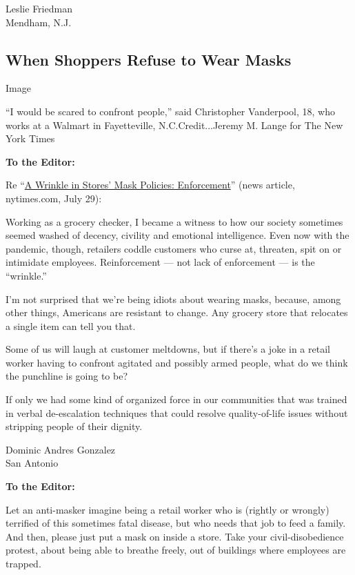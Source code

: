 Leslie Friedman\\
Mendham, N.J.

\hypertarget{when-shoppers-refuse-to-wear-masks}{%
\subsection{When Shoppers Refuse to Wear
Masks}\label{when-shoppers-refuse-to-wear-masks}}

Image

``I would be scared to confront people,'' said Christopher Vanderpool,
18, who works at a Walmart in Fayetteville, N.C.Credit...Jeremy M. Lange
for The New York Times

\textbf{To the Editor:}

Re
``\href{https://www.nytimes.com/2020/07/29/business/coronavirus-masks-stores-walmart.html?action=click\&module=Top\%20Stories\&pgtype=Homepage}{A
Wrinkle in Stores' Mask Policies: Enforcement}'' (news article,
nytimes.com, July 29):

Working as a grocery checker, I became a witness to how our society
sometimes seemed washed of decency, civility and emotional intelligence.
Even now with the pandemic, though, retailers coddle customers who curse
at, threaten, spit on or intimidate employees. Reinforcement --- not
lack of enforcement --- is the ``wrinkle.''

I'm not surprised that we're being idiots about wearing masks, because,
among other things, Americans are resistant to change. Any grocery store
that relocates a single item can tell you that.

Some of us will laugh at customer meltdowns, but if there's a joke in a
retail worker having to confront agitated and possibly armed people,
what do we think the punchline is going to be?

If only we had some kind of organized force in our communities that was
trained in verbal de-escalation techniques that could resolve
quality-of-life issues without stripping people of their dignity.

Dominic Andres Gonzalez\\
San Antonio

\textbf{To the Editor:}

Let an anti-masker imagine being a retail worker who is (rightly or
wrongly) terrified of this sometimes fatal disease, but who needs that
job to feed a family. And then, please just put a mask on inside a
store. Take your civil-disobedience protest, about being able to breathe
freely, out of buildings where employees are trapped.

